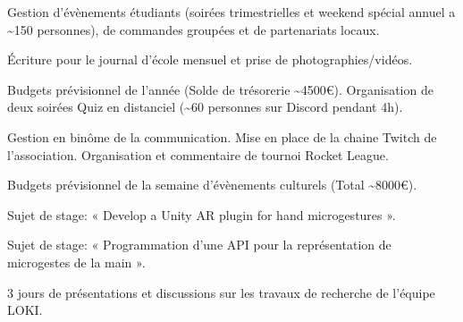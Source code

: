 \documentclass[10pt,a4paper,ragged2e,withhyper]{altacv}
\begin{document}
\begin{paracol}{2}

Gestion d’évènements étudiants (soirées trimestrielles et weekend spécial annuel a \textasciitilde150 personnes), de
commandes groupées et de partenariats locaux.

\divider


Écriture pour le journal d’école mensuel et prise de photographies/vidéos.

\divider


Budgets prévisionnel de l’année (Solde de trésorerie \textasciitilde4500€). Organisation de deux soirées Quiz en distanciel (\textasciitilde60
personnes sur Discord pendant 4h).

\divider


Gestion en binôme de la communication. Mise en place de la chaine Twitch de l’association. Organisation et
commentaire de tournoi Rocket League.

\divider


Budgets prévisionnel de la semaine d’évènements culturels (Total \textasciitilde8000€).

\medskip


Sujet de stage: « Develop a Unity AR plugin for hand microgestures ».

\divider

Sujet de stage: « Programmation d'une API pour la représentation de
microgestes de la main ».

\medskip


3 jours de présentations et discussions sur les travaux de recherche de l'équipe LOKI.


\end{paracol}
\end{document}
